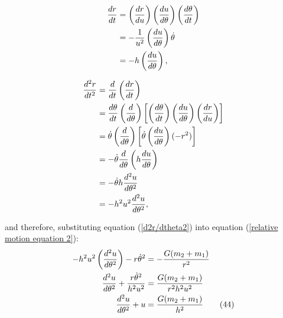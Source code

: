 \begin{minipage}[t]{0.45\textwidth}
    \begin{align*}
        \frac{dr}{dt}
        & = \left( \frac{dr}{du} \right) \left( \frac{du}{d\theta} \right) \left( \frac{d\theta}{dt} \right) \notag\\
        & = -\frac{1}{u^2} \left( \frac{du}{d\theta} \right) \dot{\theta} \notag\\
        & = -h \left( \frac{du}{d\theta} \right), \notag\\
    \end{align*} \notag
\end{minipage} \notag
\begin{minipage}[t]{0.45\textwidth}
    \begin{align}
        \frac{d^2r}{dt^2} 
        & = \frac{d}{dt}\left( \frac{dr}{dt} \right) \notag\\
        & = \frac{d\theta}{dt} \left( \frac{d}{d\theta} \right) \left[ \left( \frac{d\theta}{dt} \right) \left( \frac{du}{d\theta} \right) \left( \frac{dr}{du} \right) \right] \notag\\
        & = \dot{\theta} \left( \frac{d}{d\theta} \right) \left[ \dot{\theta} \left( \frac{du}{d\theta} \right) (-r^2) \right] \notag\\
        & = -\dot{\theta} \frac{d}{d\theta} \left( h \frac{du}{d\theta} \right) \notag\\
        & = -\dot{\theta} h \frac{d^2u}{d\theta^2} \notag\\
        & = -h^2u^2 \frac{d^2u}{d\theta^2},
        \label{d2r/dtheta2}
    \end{align}
\end{minipage}

and therefore, substituting equation (\ref{d2r/dtheta2}) into equation (\ref{relative motion equation 2}):
\begin{align}
    -h^2u^2 \left( \frac{d^2u}{d\theta^2} \right) - r\dot{\theta}^2 & = -\frac{G(m_{2}+m_{1})}{r^2} \notag\\
    \frac{d^2u}{d\theta^2} + \frac{r\dot{\theta}^2}{h^2u^2} & = \frac{G(m_{2}+m_{1})}{r^2h^2u^2} \notag\\
    \frac{d^2u}{d\theta^2} + u & = \frac{G(m_{2}+m_{1})}{h^2} 
    \label{non-homogeneous differential eq}
    \tag{44}
\end{align}


